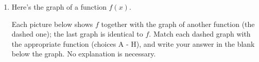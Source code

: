 \documentclass{article}
\theoremstyle{theorem}
\begin{document}
\begin{enumerate}
\item \label{fall2018-midterm-5}  %

  \def\FunctionF(#1){0.1*((#1)^3- 9*(#1))}%
  \def\FunctionG(#1){0.2*((#1)^3- 9*(#1))}%
  \def\FunctionH(#1){0.1*(((#1))^3- 9*((#1)))-2}%
  \def\FunctionP(#1){0.1*((2*(#1))^3- 9*(2*(#1)))}%
  \def\FunctionQ(#1){0.1*((2*(#1))^3- 9*(2*(#1)))-2}%
  \def\FunctionR(#1){-1*(0.1*((#1)^3- 9*(#1)))}%

  Here's the graph of a function $f(x)$. 

  \begin{center}	
  \end{center}

  Each picture below shows $f$ together with the graph of another function (the dashed one); the last graph is identical to $f$. Match each dashed graph with the appropriate function (choices A - H), and write your answer in the blank below the graph. No explanation is necessary. 



\end{enumerate}
\end{document}
